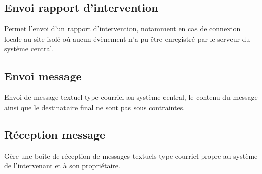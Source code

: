 \documentclass[a4paper, 11pt, final]{article}
\begin{document}
%
%
%
%
%
%
%

\subsection{Envoi rapport d'intervention}
Permet l'envoi d'un rapport d'intervention, notamment en cas de connexion locale au site isolé où aucun évènement n'a pu être enregistré par le serveur du système central.

\subsection{Envoi message}
Envoi de message textuel type courriel au système central, le contenu du message ainsi que le destinataire final ne sont pas sous contraintes.

\subsection{Réception message}
Gère une boîte de réception de messages textuels type courriel propre au système de l'intervenant et à son propriétaire.
\end{document}
